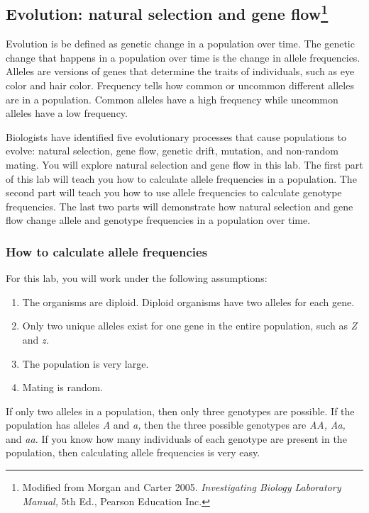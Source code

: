 \documentclass[12pt]{exam}
\newcommand{\allele}[1]{\textit{#1}}
\begin{document}
\subsection*{Evolution: natural selection and gene flow\footnote{Modified from Morgan and Carter 2005. \emph{Investigating Biology Laboratory Manual,} 5th Ed., Pearson Education Inc.}}

Evolution is be defined as genetic change in a population over time. The genetic change that happens in a population over time is the change in allele frequencies. Alleles are versions of genes that determine the traits of individuals, such as eye color and hair color. Frequency tells how common or uncommon different alleles are in a population. Common alleles have a high frequency while uncommon alleles have a low frequency.  

Biologists have identified five evolutionary processes that cause populations to evolve: natural selection, gene flow, genetic drift, mutation, and non-random mating. You will explore natural selection and gene flow in this lab.  The first part of this lab will teach you how to calculate allele frequencies in a population. The second part will teach you how to use allele frequencies to calculate genotype frequencies.  The last two parts will demonstrate how natural selection and gene flow change allele and genotype frequencies in a population over time. 

\subsubsection*{How to calculate allele frequencies}

For this lab, you will work under the following assumptions:

\begin{enumerate}

	\item The organisms are diploid. Diploid organisms have two alleles for each gene.
	
	\item Only two unique alleles exist for one gene in the entire population, such as \allele{Z} and \allele{z.}
	
	\item The population is very large.
	
	\item Mating is random.
	
\end{enumerate}

If only two alleles in a population, then only three genotypes are possible. If the population has alleles \allele{A} and \allele{a,} then the three possible genotypes are \allele{AA,} \allele{Aa,} and \allele{aa.}  If you know how many individuals of each genotype are present in the population, then calculating allele frequencies is very easy. 
\end{document}

